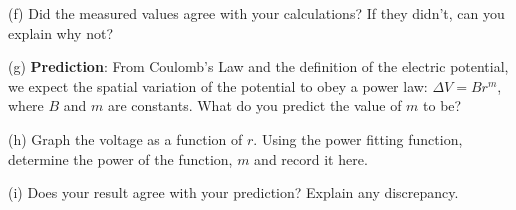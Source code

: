 (f) Did the measured values agree with your calculations? If they didn't,
can you explain why not?\vspace{15mm}

(g) \textbf{Prediction}: From Coulomb's Law and the definition of the
electric potential, we expect the spatial variation of the potential
to obey a power law: \( \Delta V=Br^{m} \), where \( B \) and \( m \)
are constants. What do you predict the value of \( m \) to be?\vspace{15mm}

(h) Graph the voltage as a function of $r$. Using the power fitting
function, determine the power of the function, $m$ and record it here.
\vspace{15mm}

(i) Does your result agree with your prediction? Explain any discrepancy.\vspace{15mm}


